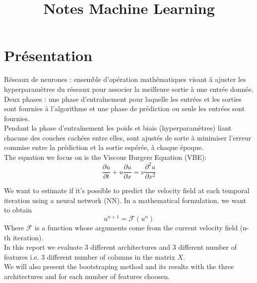 \documentclass[a4paper,12pt]{report}
\title{\navy \textbf{Notes Machine Learning} \color{black}}%
\date{}
\newcommand{\bepar}[1]{
	\left( #1 \right)  
}
\numberwithin{equation}{section} %
\begin{document}
\maketitle
\chapter{Présentation}
Réseaux de neurones : ensemble d'opération mathématiques visant à ajuster les hyperparamètres du réseaux pour associer la meilleure sortie à une entrée donnée. \\
Deux phases : une phase d'entraînement pour laquelle les entrées et les sorties sont fournies à l'algorithme et une phase de prédiction ou seule les entrées sont fournies.\\
Pendant la phase d'entraînement les poids et biais (hyperparamètres) liant chacune des couches cachées entre elles, sont ajustés de sorte à minimiser l'erreur commise entre la prédiction et la sortie espérée, à chaque époque.\\

\noindent The equation we focus on is the Viscous Burgers Equation (VBE):
\begin{equation*}
\frac{\partial u}{\partial t} + u \frac{\partial u}{\partial x} = \nu \frac{\partial^2 u}{\partial x^2} 
\end{equation*}

We want to estimate if it's possible to predict the velocity field at each temporal iteration using a neural network (NN). In a mathematical formulation, we want to obtain  
\begin{equation*}
u^{n+1} = \mathcal{F}\bepar{u^n}	
\end{equation*}
Where $\mathcal{F}$ is a function whose arguments come from the current velocity field (n-th iteration).\\
In this report we evaluate 3 different architectures and 3 different number of features i.e. 3 different number of columns in the matrix $X$.\\
We will also present the bootstraping method and its results with the three architectures and for each number of features choosen.

\pagebreak
\end{document}
